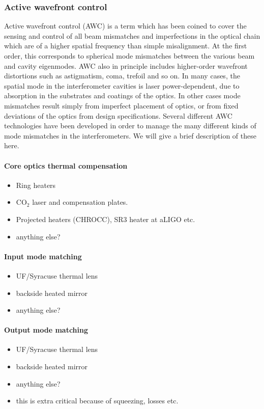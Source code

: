 \subsubsection{Active wavefront control}
Active wavefront control (AWC) is a term which has been coined to cover the sensing and control of all beam mismatches and imperfections in the optical chain which are of a higher spatial frequency than simple misalignment. At the first order, this corresponds to spherical mode mismatches between the various beam and cavity eigenmodes. AWC also in principle includes higher-order wavefront distortions such as astigmatism, coma, trefoil and so on. In many cases, the spatial mode in the interferometer cavities is laser power-dependent, due to absorption in the substrates and coatings of the optics. In other cases mode mismatches result simply from imperfect placement of optics, or from fixed deviations of the optics from design specifications. Several different AWC technologies have been developed in order to manage the many different kinds of mode mismatches in the interferometers. We will give a brief description of these here.

\paragraph{Core optics thermal compensation}
\begin{itemize}
\item Ring heaters
\item CO$_{2}$ laser and compensation plates.
\item Projected heaters (CHROCC), SR3 heater at aLIGO etc.
\item anything else?
\end{itemize}
\paragraph{Input mode matching}
\begin{itemize}
\item UF/Syracuse thermal lens
\item backside heated mirror
\item anything else?
\end{itemize}

\paragraph{Output mode matching}
\begin{itemize}
\item UF/Syracuse thermal lens
\item backside heated mirror
\item anything else?
\item this is extra critical because of squeezing, losses etc.
\end{itemize}
